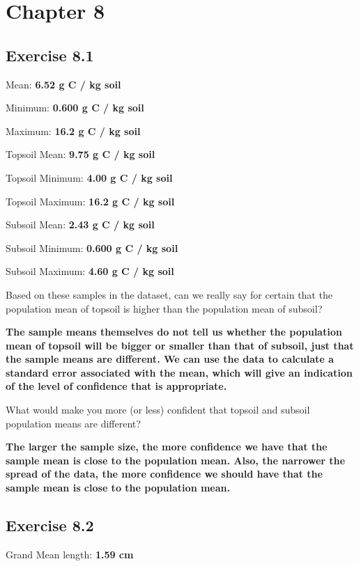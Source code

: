 \documentclass[
]{scrbook}
\begin{document}
\hypertarget{chapter-8}{%
\section{Chapter 8}\label{chapter-8}}

\hypertarget{exercise-8.1}{%
\subsection{Exercise 8.1}\label{exercise-8.1}}

Mean: \textbf{6.52 g C / kg soil}

Minimum: \textbf{0.600 g C / kg soil}

Maximum: \textbf{16.2 g C / kg soil}

Topsoil Mean: \textbf{9.75 g C / kg soil}

Topsoil Minimum: \textbf{4.00 g C / kg soil}

Topsoil Maximum: \textbf{16.2 g C / kg soil}

Subsoil Mean: \textbf{2.43 g C / kg soil}

Subsoil Minimum: \textbf{0.600 g C / kg soil}

Subsoil Maximum: \textbf{4.60 g C / kg soil}

Based on these samples in the dataset, can we really say for certain that the population mean of topsoil is higher than the population mean of subsoil?

\textbf{The sample means themselves do not tell us whether the population mean of topsoil will be bigger or smaller than that of subsoil, just that the sample means are different. We can use the data to calculate a standard error associated with the mean, which will give an indication of the level of confidence that is appropriate.}

What would make you more (or less) confident that topsoil and subsoil population means are different?

\textbf{The larger the sample size, the more confidence we have that the sample mean is close to the population mean. Also, the narrower the spread of the data, the more confidence we should have that the sample mean is close to the population mean.}

\hypertarget{exercise-8.2}{%
\subsection{Exercise 8.2}\label{exercise-8.2}}

Grand Mean length: \textbf{1.59 cm}
\end{document}
